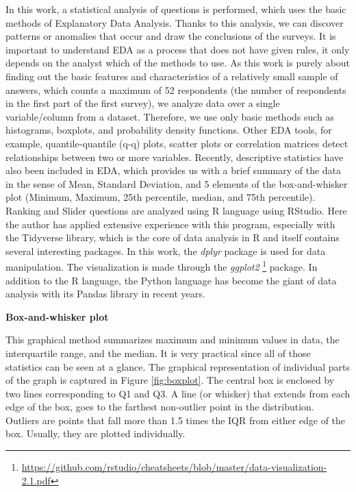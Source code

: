 \documentclass[a4paper,10pt,twoside]{article}
\begin{document}
\noindent In this work, a statistical analysis of questions is performed, which uses the basic methods of Explanatory Data Analysis. Thanks to this analysis, we can discover patterns or anomalies that occur and draw the conclusions of the surveys. It is important to understand EDA as a process that does not have given rules, it only depends on the analyst which of the methods to use. As this work is purely about finding out the basic features and characteristics of a relatively small sample of answers, which counts a maximum of 52 respondents (the number of respondents in the first part of the first survey), we analyze data over a single variable/column from a dataset. Therefore, we use only basic methods such as histograms, boxplots, and probability density functions. Other EDA tools, for example, quantile-quantile (q-q) plots, scatter plots or correlation matrices detect relationships between two or more variables. Recently, descriptive statistics have also been included in EDA, which provides us with a brief summary of the data in the sense of Mean, Standard Deviation, and 5 elements of the box-and-whisker plot (Minimum, Maximum, 25th percentile, median, and 75th percentile). Ranking and Slider questions are analyzed using R language using RStudio. Here the author has applied extensive experience with this program, especially with the Tidyverse library, which is the core of data analysis in R and itself contains several interesting packages. In this work, the \textit{dplyr} package is used for data manipulation. The visualization is made through the \textit{ggplot2} \footnote{\url{https://github.com/rstudio/cheatsheets/blob/master/data-visualization-2.1.pdf}} package. In addition to the R language, the Python language has become the giant of data analysis with its Pandas library in recent years.

\bigskip
\noindent \textbf{Box-and-whisker plot}

\noindent This graphical method summarizes maximum and minimum values in data, the interquartile range, and the median. It is very practical since all of those statistics can be seen at a glance. The graphical representation of individual parts of the graph is captured in Figure \ref{fig:boxplot}. The central box is enclosed by two lines corresponding to Q1 and Q3. A line (or whisker) that extends from each edge of the box, goes to the farthest non-outlier point in the distribution. Outliers are points that fall more than 1.5 times the IQR from either edge of the box. Usually, they are plotted individually.
\end{document}
